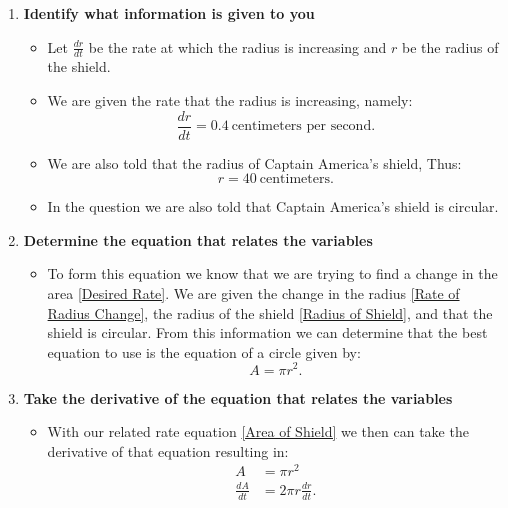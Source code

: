 \documentclass[12pt]{article}
\begin{document}
\begin{enumerate}
  \item \textbf{Identify what information is given to you}
  \begin{itemize}
    \item Let $\frac{dr}{dt}$ be the rate at which the radius is increasing and $r$ be the radius of the shield.
    \item We are given the rate that the radius is increasing, namely:
    \begin{equation}
      \frac{dr}{dt} = 0.4\ \text{centimeters per second}. \tag{Rate of Radius Change} \label{Rate of Radius Change}
    \end{equation}
    \item We are also told that the radius of Captain America's shield, Thus:
    \begin{equation}
      r = 40\ \text{centimeters}. \tag{Radius of Shield} \label{Radius of Shield}
    \end{equation}
    \item In the question we are also told that Captain America's shield is circular.
  \end{itemize}
\newpage
  \item \textbf{Determine the equation that relates the variables}
    \begin {itemize}
      \item To form this equation we know that we are trying to find a change in the area \eqref{Desired Rate}. We are given the change in the radius \eqref{Rate of Radius Change}, the radius of the shield \eqref{Radius of Shield}, and that the shield is circular. From this information we can determine that the best equation to use is the equation of a circle given by:
      \begin{equation}
        A = \pi r^2. \tag{Related Rate Equation} \label{Area of Shield}
      \end{equation}
    \end{itemize}
  \item \textbf{Take the derivative of the equation that relates the variables}
    \begin{itemize}
      \item With our related rate equation \eqref{Area of Shield} we then can take the derivative of that equation resulting in:
      \begin{equation}
      \begin{split}
        A &= \pi r^2\\
        \frac{dA}{dt} &= 2 \pi r \frac{dr}{dt}.
      \end{split}

\end{equation}
\end{itemize}
\end{enumerate}
\end{document}

